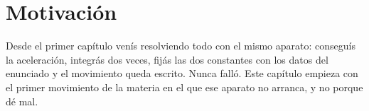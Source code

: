\documentclass[11pt,openany]{book}
\newcommand{\sen}{\operatorname{sen}}
\renewcommand{\miNombre}{Pedro Villar}
\begin{document}
%
%
%
%


\section{Motivación}

\begin{motivacion}
Desde el primer capítulo venís resolviendo todo con el mismo aparato: conseguís la aceleración, integrás dos veces, fijás las dos constantes con los datos del enunciado y el movimiento queda escrito. Nunca falló. Este capítulo empieza con el primer movimiento de la materia en el que ese aparato no arranca, y no porque dé mal.
\end{motivacion}
\end{document}
